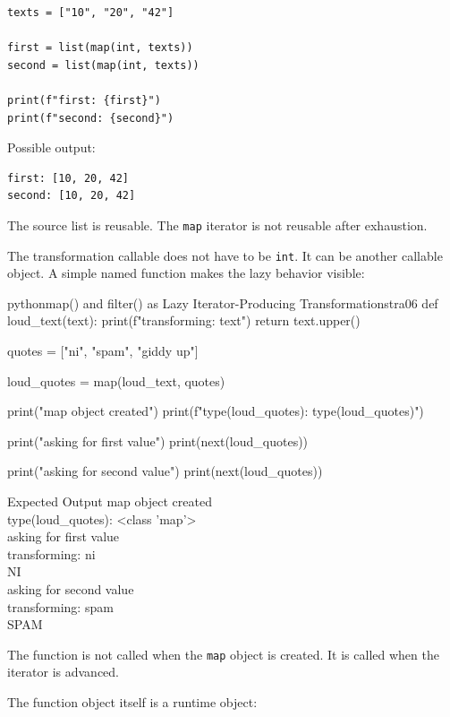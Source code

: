 \begin{verbatim}
texts = ["10", "20", "42"]

first = list(map(int, texts))
second = list(map(int, texts))

print(f"first: {first}")
print(f"second: {second}")
\end{verbatim}

Possible output:

\begin{verbatim}
first: [10, 20, 42]
second: [10, 20, 42]
\end{verbatim}

The source list is reusable. The \texttt{map} iterator is not reusable after exhaustion.

The transformation callable does not have to be \texttt{int}. It can be another callable object. A simple named function makes the lazy behavior visible:

\begin{codebox}[]{python}{map() and filter() as Lazy Iterator-Producing Transformations}{tra06}
def loud_text(text):
    print(f"transforming: {text}")
    return text.upper()

quotes = ["ni", "spam", "giddy up"]

loud_quotes = map(loud_text, quotes)

print("map object created")
print(f"type(loud_quotes): {type(loud_quotes)}")

print("asking for first value")
print(next(loud_quotes))

print("asking for second value")
print(next(loud_quotes))
\end{codebox}


\begin{iobox}{Expected Output}
map object created \\
type(loud\_quotes): <class 'map'> \\
asking for first value \\
transforming: ni \\
NI \\
asking for second value \\
transforming: spam \\
SPAM \\
\end{iobox}




The function is not called when the \texttt{map} object is created. It is called when the iterator is advanced.

The function object itself is a runtime object:

